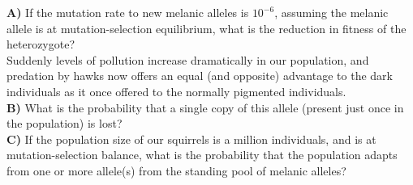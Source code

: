 {\begin{question}
{\bf A)} If the mutation rate to new melanic alleles is $10^{-6}$, assuming the melanic allele is at mutation-selection equilibrium, what
is the reduction in fitness of the heterozygote? \\ 
Suddenly levels of pollution increase dramatically in our population,
and predation by hawks now offers an equal (and opposite) advantage to
the dark individuals as it once offered to the normally pigmented
individuals. \\
{\bf B)} What is the probability that a single copy of this allele
(present just once in the population) is lost?\\ 
{\bf C)}  If the population size of our squirrels is a million
individuals, and is at mutation-selection balance, what is the probability that the population adapts from one or more allele(s) from the standing pool of melanic alleles?  
\end{question}


}
